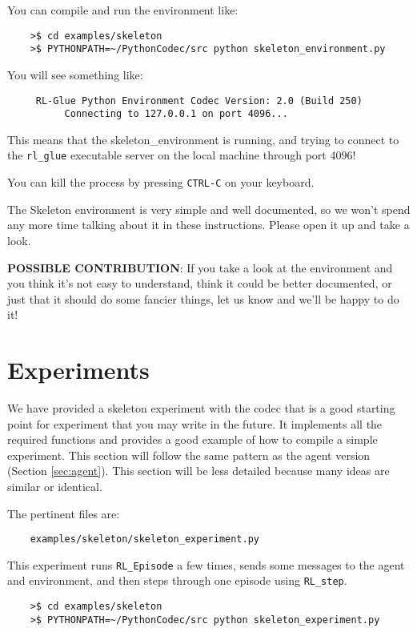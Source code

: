 \documentclass[11pt]{article}
\begin{document}
You can compile and run the environment like:
\begin{verbatim}
	>$ cd examples/skeleton
	>$ PYTHONPATH=~/PythonCodec/src python skeleton_environment.py
\end{verbatim}

You will see something like:
\begin{verbatim}
     RL-Glue Python Environment Codec Version: 2.0 (Build 250)
          Connecting to 127.0.0.1 on port 4096...
\end{verbatim}

This means that the skeleton\_environment is running, and trying to connect to the \texttt{rl\_glue} executable server on the local machine through port $4096$! 

You can kill the process by pressing \texttt{CTRL-C} on your keyboard.


The Skeleton environment is very simple and well documented, so we won't spend any more time talking about it in these instructions.
Please open it up and take a look.

\textbf{POSSIBLE CONTRIBUTION}: If you take a look at the environment and you think it's not easy to understand, think it could be better documented, 
or just that it should do some fancier things, let us know and we'll be happy to do it!


\section{Experiments}
We have provided a skeleton experiment with the codec that is a good starting point for experiment that you may write in the future.
It implements all the required functions and provides a good example of how to compile a simple experiment.  This section will follow the same 
pattern as the agent version (Section \ref{sec:agent}).  This section will be less detailed because many ideas are similar or identical.

The pertinent files are:
\begin{verbatim}
	examples/skeleton/skeleton_experiment.py
\end{verbatim}

This experiment runs \texttt{RL\_Episode} a few times, sends some messages to the agent and environment, and then steps through one episode using \texttt{RL\_step}.

\begin{verbatim}
	>$ cd examples/skeleton
	>$ PYTHONPATH=~/PythonCodec/src python skeleton_experiment.py
\end{verbatim}
\end{document}
